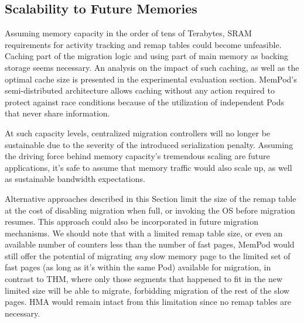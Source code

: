 \subsection{Scalability to Future Memories}
Assuming memory capacity in the order of tens of Terabytes, SRAM requirements for activity tracking and remap tables could become unfeasible. Caching part of the migration logic and using part of main memory as backing storage seems necessary. An analysis on the impact of such caching, as well as the optimal cache size is presented in the experimental evaluation section. MemPod's semi-distributed architecture allows caching without any action required to protect against race conditions because of the utilization of independent Pods that never share information.

At such capacity levels, centralized migration controllers will no longer be sustainable due to the severity of the introduced serialization penalty. Assuming the driving force behind memory capacity's tremendous scaling are future applications, it's safe to assume that memory traffic would also scale up, as well as sustainable bandwidth expectations. 

Alternative approaches described in this Section limit the size of the remap table at the cost of disabling migration when full, or invoking the OS before migration resumes. This approach could also be incorporated in future migration mechanisms. We should note that with a limited remap table size, or even an available number of counters less than the number of fast pages, MemPod would still offer the potential of migrating \textit{any} slow memory page to the limited set of fast pages (as long as it's within the same Pod) available for migration, in contrast to THM, where only those segments that happened to fit in the new limited size will be able to migrate, forbidding migration of the rest of the slow pages. HMA would remain intact from this limitation since no remap tables are necessary.



















































